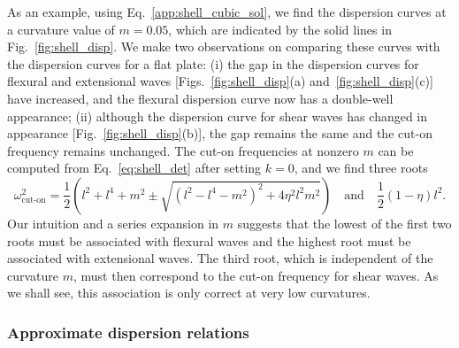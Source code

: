 As an example, using Eq.~\eqref{app:shell_cubic_sol}, we find the dispersion curves at a curvature value of $m = 0.05$, which are indicated by the solid lines in Fig.~\ref{fig:shell_disp}.
We make two observations on comparing these curves with the dispersion curves for a flat plate:
(i) the gap in the dispersion curves for flexural and extensional waves [Figs.~\ref{fig:shell_disp}(a) and~\ref{fig:shell_disp}(c)] have increased, and the flexural dispersion curve now has a double-well appearance;
(ii) although the dispersion curve for shear waves has changed in appearance [Fig.~\ref{fig:shell_disp}(b)], the gap remains the same and the cut-on frequency remains unchanged.
The cut-on frequencies at nonzero $m$ can be computed from Eq.~\eqref{eq:shell_det} after setting $k = 0$, and we find three roots
%
\begin{equation}
  \omega^{2}_{\text{cut-on}} =
    \frac{1}{2}\left(l^{2} + l^{4} + m^{2} \pm \sqrt{\left(l^{2} - l^{4} - m^{2}\right)^{2} + 4\eta^{2}l^{2}m^{2}}\right)
    \quad\text{and}\quad
    \frac{1}{2}(1-\eta)l^{2}.
    \label{eq:shell_cuton}
\end{equation}
%
Our intuition and a series expansion in $m$ suggests that the lowest of the first two roots must be associated with flexural waves and the highest root must be associated with extensional waves.
The third root, which is independent of the curvature $m$, must then correspond to the cut-on frequency for shear waves.
As we shall see, this association is only correct at very low curvatures.

\subsubsection*{Approximate dispersion relations}

